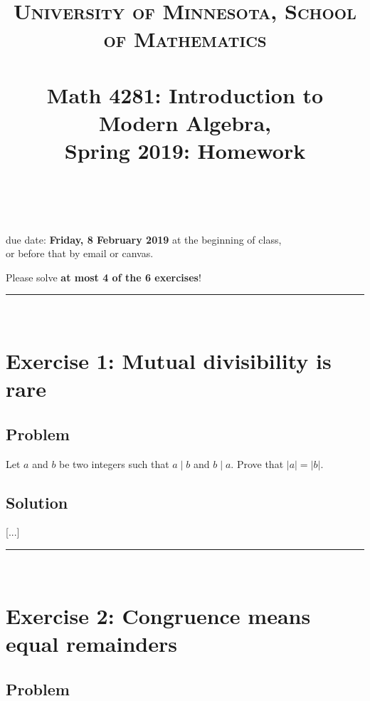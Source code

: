 \documentclass[paper=a4, fontsize=12pt]{scrartcl} %
\title{	
\normalfont \normalsize 
\textsc{University of Minnesota, School of Mathematics} \\ [25pt] %
\horrule{0.5pt} \\[0.4cm] %
\huge Math 4281: Introduction to Modern Algebra, \\
Spring 2019:
Homework \psetnumber\\%
\horrule{2pt} \\[0.5cm] %
}
\author{\myname}
\newcommand{\abs}[1]{\left| #1 \right|}
\newcommand{\horrule}[1]{\rule{\linewidth}{#1}} %
\theoremstyle{plainsl}
\theoremstyle{definition}
\theoremstyle{remark}
\begin{document}
\maketitle %

\begin{center} %
{\large due date: \textbf{Friday, 8 February 2019} at the beginning of class, \\
or before that by email or canvas.

Please solve \textbf{at most 4 of the 6 exercises}!}
\end{center}

\horrule{0.3pt} \\[0.4cm]

\section{Exercise 1: Mutual divisibility is rare}

\subsection{Problem}

Let $a$ and $b$ be two integers such that $a \mid b$ and
$b \mid a$.
Prove that $\abs{a} = \abs{b}$.

\subsection{Solution}

[...]

\horrule{0.3pt} \\[0.4cm]

\section{Exercise 2: Congruence means equal remainders}

\subsection{Problem}
\end{document}
